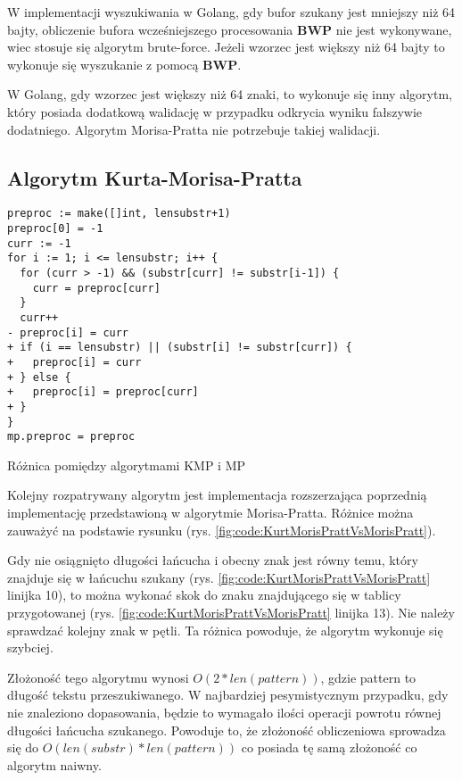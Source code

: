 W implementacji wyszukiwania w Golang, gdy bufor szukany jest mniejszy niż 64 bajty,
obliczenie bufora wcześniejszego procesowania \textbf{BWP} nie jest wykonywane, 
wiec stosuje się algorytm brute-force. Jeżeli wzorzec jest większy niż 64 
bajty to wykonuje się wyszukanie z pomocą \textbf{BWP}.

W Golang, gdy wzorzec jest większy niż
64 znaki, to wykonuje się inny algorytm, który posiada dodatkową walidację w
przypadku odkrycia wyniku fałszywie dodatniego. Algorytm Morisa-Pratta nie
 potrzebuje takiej walidacji.

\subsection{Algorytm Kurta-Morisa-Pratta}

\begin{listing}[H]
    \begin{verbatim}
preproc := make([]int, lensubstr+1)
preproc[0] = -1
curr := -1
for i := 1; i <= lensubstr; i++ {
  for (curr > -1) && (substr[curr] != substr[i-1]) {
    curr = preproc[curr]
  }
  curr++
- preproc[i] = curr
+ if (i == lensubstr) || (substr[i] != substr[curr]) {
+   preproc[i] = curr
+ } else {
+   preproc[i] = preproc[curr]
+ }
}
mp.preproc = preproc
    \end{verbatim}
  \caption{Różnica pomiędzy algorytmami KMP i MP}
  \label{fig:code:KurtMorisPrattVsMorisPratt}
\end{listing}

Kolejny rozpatrywany algorytm jest implementacja rozszerzająca poprzednią 
implementację przedstawioną w algorytmie Morisa-Pratta. Różnice można zauważyć na podstawie rysunku
(rys. \ref{fig:code:KurtMorisPrattVsMorisPratt}).

Gdy nie osiągnięto długości łańcucha i obecny znak jest równy temu, który 
znajduje się w łańcuchu szukany (rys. \ref{fig:code:KurtMorisPrattVsMorisPratt}
linijka 10), to można wykonać skok do znaku znajdującego się w tablicy
przygotowanej (rys. \ref{fig:code:KurtMorisPrattVsMorisPratt} linijka 13).
Nie należy sprawdzać kolejny znak w pętli. Ta różnica powoduje, że algorytm 
wykonuje się szybciej.

Złożoność tego algorytmu wynosi $O(2*{len(pattern)})$, gdzie pattern to długość
tekstu przeszukiwanego. W najbardziej pesymistycznym przypadku, gdy nie 
znaleziono dopasowania, będzie to wymagało ilości operacji powrotu równej długości 
łańcucha szukanego. Powoduje to, że złożoność obliczeniowa sprowadza się do
$O({len(substr)}*{len(pattern)})$ co posiada tę samą złożoność co algorytm naiwny. 

